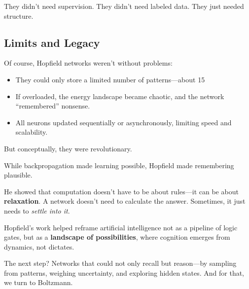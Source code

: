 They didn’t need supervision. They didn’t need labeled data. They just needed structure.

\subsection{Limits and Legacy}

Of course, Hopfield networks weren’t without problems:
\begin{itemize}
  \item They could only store a limited number of patterns—about 15%
  \item If overloaded, the energy landscape became chaotic, and the network “remembered” nonsense.
  \item All neurons updated sequentially or asynchronously, limiting speed and scalability.
\end{itemize}

But conceptually, they were revolutionary.

\begin{tcolorbox}[colback=blue!5!white, colframe=blue!50!black,
title={Hopfield’s Contribution}]
While backpropagation made learning possible, Hopfield made remembering plausible.

He showed that computation doesn’t have to be about rules—it can be about \textbf{relaxation}. A network doesn’t need to calculate the answer. Sometimes, it just needs to \textit{settle into it}.
\end{tcolorbox}

Hopfield’s work helped reframe artificial intelligence not as a pipeline of logic gates, but as a \textbf{landscape of possibilities}, where cognition emerges from dynamics, not dictates.

The next step? Networks that could not only recall but reason—by sampling from patterns, weighing uncertainty, and exploring hidden states. And for that, we turn to Boltzmann.
